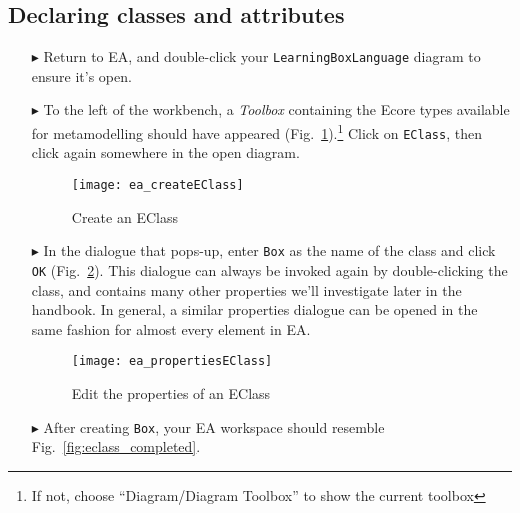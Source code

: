 \newpage
\subsection{Declaring classes and attributes}
\visHeader
\hypertarget{static:classes vis}{}

\begin{itemize}

\item[$\blacktriangleright$] Return to EA, and double-click your \texttt{LearningBoxLanguage} diagram to ensure it's open.

\vspace{0.5cm}

\item[$\blacktriangleright$] To the left of the workbench, a \emph{Toolbox} containing the Ecore types available for metamodelling should have
appeared (Fig.~\ref{fig:eclass}).\footnote{If not, choose ``Diagram/Diagram Toolbox'' to show the current toolbox}  
Click on \texttt{EClass}, then click again somewhere in the open diagram.

\vspace{0.5cm}

\begin{figure}[htbp]
	\centering
  \texttt{[image: ea\_createEClass]}
	\caption{Create an EClass}
	\label{fig:eclass}
\end{figure}

\vspace{0.5cm}

\item[$\blacktriangleright$] In the dialogue that pops-up, enter \texttt{Box} as the name of the class and click \texttt{OK} (Fig.~\ref{fig:eclass_properties}).
This dialogue can always be invoked again by double-clicking the class, and contains many other properties we'll investigate later in the handbook.
In general, a similar properties dialogue can be opened in the same fashion for almost every element in EA.

\begin{figure}[ht]
	\centering
  \texttt{[image: ea\_propertiesEClass]}
	\caption{Edit the properties of an EClass}
	\label{fig:eclass_properties}
\end{figure}

\newpage

\item[$\blacktriangleright$] After creating \texttt{Box}, your EA workspace should resemble Fig.~\ref{fig:eclass_completed}.


\end{itemize}
